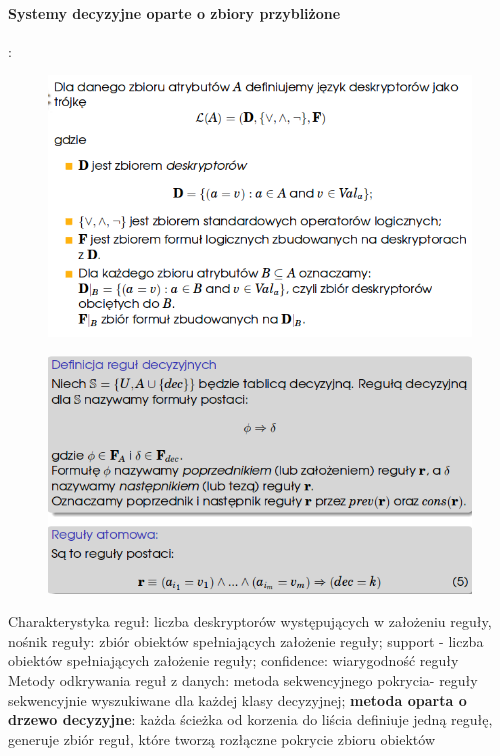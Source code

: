 \documentclass[10pt,a4paper]{article}
\begin{document}
  \paragraph{Systemy decyzyjne oparte o zbiory przybliżone} :
  \begin{figure}[H]
    \centering
      \includegraphics[scale=0.50]{images/des.png}
  \end{figure}
  \begin{figure}[H]
    \centering
      \includegraphics[scale=0.50]{images/regula.png}
  \end{figure}
  Charakterystyka reguł: liczba deskryptorów występujących w założeniu reguły, nośnik reguły: zbiór obiektów spełniających założenie reguły; support - liczba obiektów spełniających założenie reguły; confidence: wiarygodność reguły \\
  Metody odkrywania reguł z danych: metoda sekwencyjnego pokrycia- reguły sekwencyjnie wyszukiwane dla każdej klasy decyzyjnej; \textbf{metoda oparta o drzewo decyzyjne}: każda ścieżka od korzenia do liścia definiuje jedną regułę, generuje zbiór reguł, które tworzą rozłączne pokrycie zbioru obiektów
\end{document}
